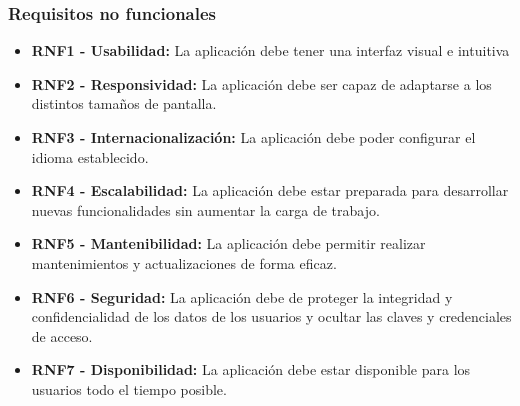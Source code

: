 \subsubsection{Requisitos no funcionales}
\begin{itemize}
\tightlist
    \item \textbf{RNF1 - Usabilidad:} La aplicación debe tener una interfaz visual e intuitiva
    \item \textbf{RNF2 - Responsividad:} La aplicación debe ser capaz de adaptarse a los distintos tamaños de pantalla.
    \item \textbf{RNF3 - Internacionalización:} La aplicación debe poder configurar el idioma establecido.
    \item \textbf{RNF4 - Escalabilidad:} La aplicación debe estar preparada para desarrollar nuevas funcionalidades sin aumentar la carga de trabajo.
    \item \textbf{RNF5 - Mantenibilidad:} La aplicación debe permitir realizar mantenimientos y actualizaciones de forma eficaz. 
    \item \textbf{RNF6 - Seguridad:} La aplicación debe de proteger la integridad y confidencialidad de los datos de los usuarios y ocultar las claves y credenciales de acceso.
    \item \textbf{RNF7 - Disponibilidad:} La aplicación debe estar disponible para los usuarios todo el tiempo posible.
    
\end{itemize}



